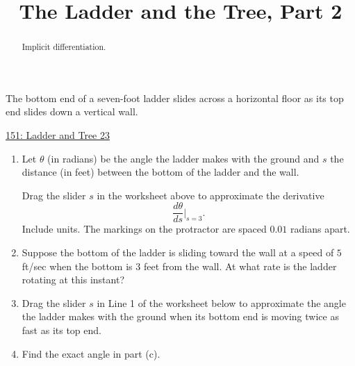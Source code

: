 \documentclass{ximera}
\title{The Ladder and the Tree, Part 2}
\begin{document}
\begin{abstract}
Implicit differentiation.
\end{abstract}
\maketitle

\begin{question}  \label{Qhfhghllllgg}
The bottom end of a seven-foot ladder slides across a horizontal floor as its top end slides down a vertical wall.

\begin{onlineOnly}
   \begin{center}
\end{center}
\end{onlineOnly}

\href{https://www.desmos.com/calculator/4nmxshey0e}{151: Ladder and Tree 23}  %

\begin{enumerate}

\item Let $\theta$ (in radians) be the angle the ladder makes with the ground and $s$ the distance (in feet)  between the bottom of the ladder and the wall.

Drag the slider $s$ in the worksheet above to approximate the derivative
\[
   \frac{d\theta}{ds}\Big|_{s=3} .
\]
Include units. The markings on the protractor are spaced $0.01$ radians apart.

\item Suppose the bottom of the ladder is sliding toward the wall at a speed of $5$ ft/sec when the bottom is $3$ feet from the wall. At what rate is the ladder rotating at this instant? 

\item Drag the slider $s$ in Line 1 of the worksheet below to approximate the angle the ladder makes with the ground when its bottom end is moving twice as fast as its top end.

\item Find the exact angle in part (c).
\end{enumerate}

 


\end{question}
\end{document}

